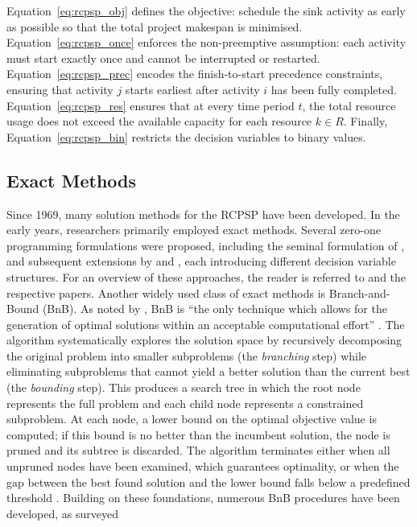 Equation~\eqref{eq:rcpsp_obj} defines the objective: schedule the sink activity as
early as possible so that the total project makespan is minimised.
Equation~\eqref{eq:rcpsp_once} enforces the non-preemptive assumption: each activity
must start exactly once and cannot be interrupted or restarted.
Equation~\eqref{eq:rcpsp_prec} encodes the finish-to-start precedence constraints,
ensuring that activity $j$ starts earliest after activity $i$ has been fully completed.
Equation~\eqref{eq:rcpsp_res} ensures that at every time period $t$, the total resource
usage does not exceed the available capacity for each resource $k \in R$.
Finally, Equation~\eqref{eq:rcpsp_bin} restricts the decision variables to binary values.
\subsection*{Exact Methods}
Since 1969, many solution methods for the RCPSP have been developed. In the early
years, researchers primarily employed exact methods. Several zero-one programming
formulations were proposed, including the seminal formulation of \cite{Pritsker1969},
and subsequent extensions by \cite{Kaplan1988} and \cite{Mingozzi1998}, each
introducing different decision variable structures. For an overview of these approaches,
the reader is referred to \cite[p.~209 ff.]{Demeulemeester2002} and the respective
papers.
Another widely used class of exact methods is Branch-and-Bound (BnB). As noted by
\cite{Demeulemeester2002}, BnB is ``the only technique which allows for the generation
of optimal solutions within an acceptable computational effort''
\parencite[p.~219]{Demeulemeester2002}. The algorithm systematically explores the
solution space by recursively decomposing the original problem into smaller subproblems
(the \textit{branching} step) while eliminating subproblems that cannot yield a
better solution than the current best (the \textit{bounding} step). This produces a
search tree in which the root node represents the full problem and each child node
represents a constrained subproblem. At each node, a lower bound on the optimal
objective value is computed; if this bound is no better than the incumbent solution, the
node is pruned and its subtree is discarded. The algorithm terminates either when all
unpruned nodes have been examined, which guarantees optimality, or when the gap between
the best found solution and the lower bound falls below a predefined threshold
\parencite[p.~219 ff.]{Demeulemeester2002}.
Building on these foundations, numerous BnB procedures have been developed, as surveyed
